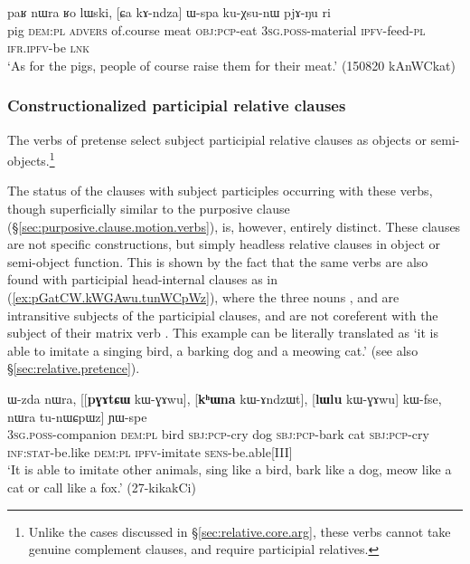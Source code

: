 \begin{exe}
	\ex \label{ex:Ca.kAndza.Wspa}
	\gll paʁ nɯra ʁo lɯski, [ɕa kɤ-ndza] ɯ-spa ku-χsu-nɯ pjɤ-ŋu ri \\
	pig \textsc{dem}:\textsc{pl} \textsc{advers} of.course meat \textsc{obj}:\textsc{pcp}-eat \textsc{3sg}.\textsc{poss}-material \textsc{ipfv}-feed-\textsc{pl} \textsc{ifr}.\textsc{ipfv}-be \textsc{lnk} \\
	\glt `As for the pigs, people of course raise them for their meat.' (150820 kAnWCkat)
\end{exe}



\subsubsection{Constructionalized participial relative clauses} \label{sec:constr.participial.clause}
The verbs of pretense select subject participial relative clauses as objects or semi-objects.\footnote{Unlike the cases discussed in §\ref{sec:relative.core.arg}, these verbs cannot take genuine complement clauses, and require participial relatives. } 

The status of the clauses with subject participles occurring with these verbs, though superficially similar to the purposive clause (§\ref{sec:purposive.clause.motion.verbs}), is, however, entirely distinct. These clauses are not specific constructions, but simply headless relative clauses in object or semi-object function. This is shown by the fact that the same verbs are also found with participial head-internal clauses as in (\ref{ex:pGatCW.kWGAwu.tunWCpWz}), where the three nouns ,  and  are intransitive subjects of the participial clauses, and are not coreferent with the subject of their matrix verb . This example can be literally translated as `it is able to imitate a singing bird, a barking dog and a meowing cat.' (see also  §\ref{sec:relative.pretence}).

\begin{exe}
	\ex \label{ex:pGatCW.kWGAwu.tunWCpWz}
	\gll ɯ-zda nɯra, [[\textbf{pɣɤtɕɯ} kɯ-ɣɤwu], [\textbf{kʰɯna} kɯ-ɤndzɯt], [\textbf{lɯlu} kɯ-ɣɤwu] kɯ-fse, nɯra tu-nɯɕpɯz] ɲɯ-spe \\
	\textsc{3sg}.\textsc{poss}-companion \textsc{dem}:\textsc{pl} bird \textsc{sbj}:\textsc{pcp}-cry dog \textsc{sbj}:\textsc{pcp}-bark cat \textsc{sbj}:\textsc{pcp}-cry \textsc{inf}:\textsc{stat}-be.like \textsc{dem}:\textsc{pl} \textsc{ipfv}-imitate \textsc{sens}-be.able[III] \\
	\glt `It is able to imitate other animals, sing like a bird, bark like a dog, meow like a cat or call like a fox.' (27-kikakCi)
\end{exe}


